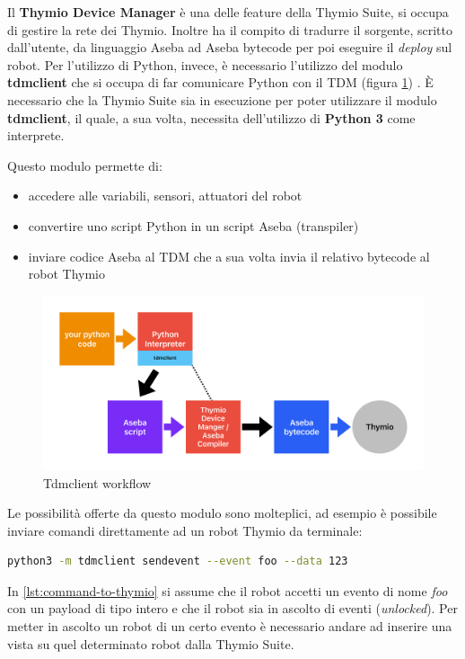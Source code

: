 \documentclass[12pt,a4paper,openright,twoside]{book}
\begin{document}
Il \textbf{Thymio Device Manager} è una delle feature della Thymio Suite, si occupa di gestire la rete dei Thymio. Inoltre ha il compito di tradurre il sorgente, scritto dall'utente, da linguaggio Aseba ad Aseba bytecode per poi eseguire il \textit{deploy} sul robot. Per l'utilizzo di Python, invece, è necessario l'utilizzo del modulo \textbf{tdmclient} che si occupa di far comunicare Python con il \ac{TDM} (figura \ref{fig:tdmclient}) \cite{pypiTdmclient}. È necessario che la Thymio Suite sia in esecuzione per poter utilizzare il modulo \textbf{tdmclient}, il quale, a sua volta, necessita dell'utilizzo di \textbf{Python 3} come interprete.

Questo modulo permette di:
\begin{itemize}
    \item accedere alle variabili, sensori, attuatori del robot
    \item convertire uno script Python in un script Aseba (transpiler)
    \item inviare codice Aseba al \ac{TDM} che a sua volta invia il relativo bytecode al  robot Thymio 
\end{itemize}

\begin{figure}
    \centering
    \includegraphics[width=.8\linewidth]{figures/TDM.pdf}
    \caption{Tdmclient workflow}
    \label{fig:tdmclient}
\end{figure}

Le possibilità offerte da questo modulo sono molteplici, ad esempio è possibile inviare comandi direttamente ad un robot Thymio da terminale:

\begin{lstlisting}[language=Bash, label={lst:command-to-thymio}, caption={Esempio di invio di comando (foo) ad un robot Thymio}]
    python3 -m tdmclient sendevent --event foo --data 123
\end{lstlisting}

In \cref{lst:command-to-thymio} si assume che il robot accetti un evento di nome \textit{foo} con un payload di tipo intero e che il robot sia in ascolto di eventi (\textit{unlocked}). Per metter in ascolto un robot di un certo evento è necessario andare ad inserire una vista su quel determinato robot dalla Thymio Suite.
\end{document}
